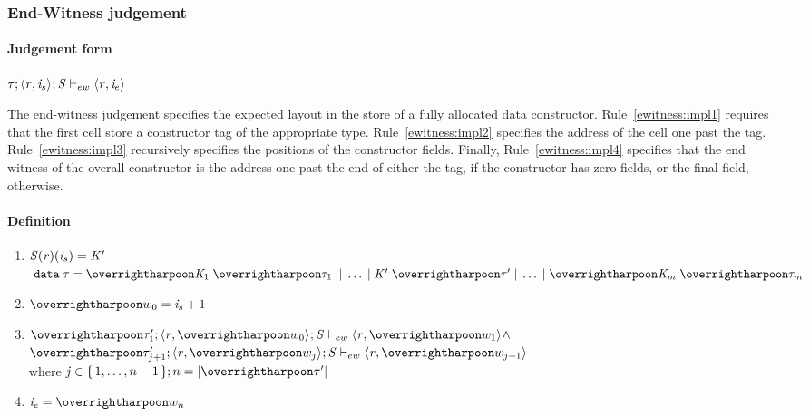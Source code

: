 \subsubsection{End-Witness judgement}
\label{sec:end-witness}

\paragraph{Judgement form}

$\mathit{\tau};\langle \mathit{r}, \mathit{i}_{s} \rangle ^{};\mathit{S} \vdash_{ew} \langle \mathit{r}, \mathit{i}_{e} \rangle ^{}$

The end-witness judgement specifies the expected layout in the store of a fully
allocated data constructor.
%
Rule~\ref{ewitness:impl1} requires that the first cell store a constructor
tag of the appropriate type.
%
Rule~\ref{ewitness:impl2} specifies the address of the cell one past the tag.
%
Rule~\ref{ewitness:impl3} recursively specifies the positions of the constructor
fields.
%
Finally, Rule~\ref{ewitness:impl4} specifies that the end witness of
the overall constructor is the address one past the end of either the
tag, if the constructor has zero fields, or the final field,
otherwise.

\paragraph{Definition}

\begin{enumerate}
\item \label{ewitness:impl1} $\mathit{S}(\mathit{r})(\mathit{i}_s) = \mathit{K}'$ \;  \\
      $\; \DATA\;\TYP = \overharpoon{\DC_1 \; \overharpoon{\sTYP}_1\;} \; | \; \ldots \; | \; \DC' \; \overharpoon{\sTYP}' \; | \; \ldots \; | \; \overharpoon{\DC_m \; \overharpoon{\sTYP}_m\;}$

\item \label{ewitness:impl4} $\overharpoon{w_0} = \ind_s + 1$

\item \label{ewitness:impl2}
  $\ewitness{\overharpoon{\TYP'_1}}{\concreteloc{\reg}{\overharpoon{w_0}}{}}{\STOR}{\concreteloc{\reg}{\overharpoon{w_1}}{}} \wedge$ \\
  $\ewitness{\overharpoon{\TYP'_{j+1}}}{\concreteloc{\reg}{\overharpoon{w_j}}{}}{\STOR}{\concreteloc{\reg}{\overharpoon{w_{j+1}}}{}}$
  \\ where $\indj \in \set{1,\ldots,n-1} ; n = | \overharpoon{\TYP'} |$

\item \label{ewitness:impl3}
  $\ind_e = \overharpoon{w_n}$
\end{enumerate}

